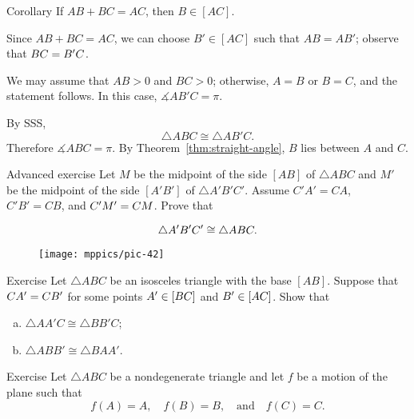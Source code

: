 \begin{thm}[\abs]{Corollary}\label{cor:degenerate-trig}
If $AB+BC=AC$, then $B\in [AC]$.
\end{thm}

Since $AB+BC=AC$, we can choose $B'\in [AC]$ such that $AB=AB'$;
observe that $BC\z=B'C$.

We may assume that $AB>0$ and $BC>0$;
otherwise, $A=B$ or $B=C$, and the statement follows.
In this case, $\measuredangle AB'C=\pi$.

By SSS, 
\[\triangle ABC\cong \triangle AB'C.\]
Therefore $\measuredangle ABC=\pi$.
By Theorem~\ref{thm:straight-angle}, $B$ lies between $A$ and $C$.
\qeds



\begin{thm}{Advanced exercise}\label{ex:SMS}
Let $M$ be the midpoint of the side $[A B]$ of $\triangle A B C$ and
$M'$ be the midpoint of the side $[A' B']$ of $\triangle A' B' C'$.
Assume $C' A'=C A$, $C' B'= C B$, and $C' M'\z= C M$.
Prove that

\[\triangle A' B' C'\z\cong\triangle A B C.\]

\end{thm}

{

\begin{wrapfigure}[6]{r}{26mm}
\vskip-0mm
\centering
\texttt{[image: mppics/pic-42]}
\end{wrapfigure}

\begin{thm}{Exercise}\label{ex:isos-sides}
Let $\triangle A B C$ be an isosceles triangle with the base $[A B]$.
Suppose that $C A'\z=C B'$
for some points $A'\z\in [B C]$ and $B'\z\in[A C]$.
Show that
\begin{enumerate}[(a)]
\item $\triangle A A' C\cong \triangle B B' C$;
\item $\triangle A B B'\cong \triangle B A A'$.
\end{enumerate}

\end{thm}

\begin{thm}{Exercise}\label{ex:ABC-motion}
Let $\triangle ABC$ be a nondegenerate triangle and 
let $f$ be a motion of the plane 
such that 
$$f(A)=A,
\quad 
f(B)=B,
\quad 
\text{and}
\quad
f(C)=C.$$

\end{thm}

}

